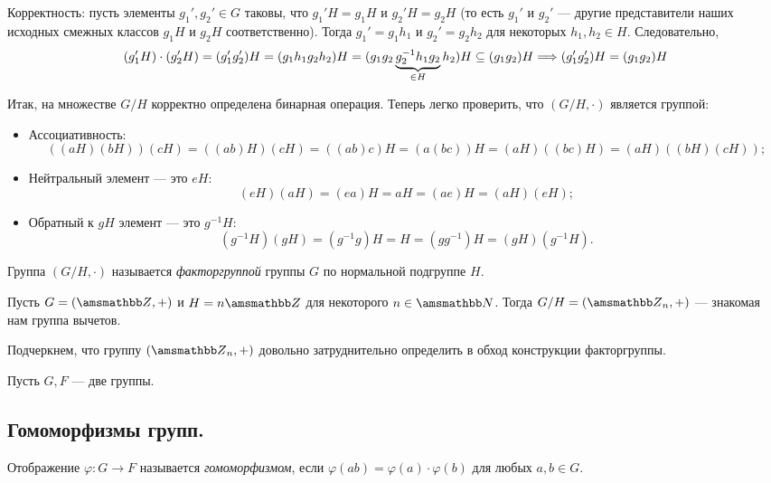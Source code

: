 Корректность: пусть элементы $g_1', g_2' \in G$ таковы, что 
$g_1'H = g_1H$ и $g_2'H = g_2H$ (то есть $g_1'$ и $g_2'$ --- другие
представители наших исходных смежных классов $g_1H$ и $g_2H$ соответственно).
Тогда $g_1' = g_1h_1$ и $g_2' = g_2h_2$ для некоторых $h_1, h_2 \in H$.
Следовательно,
\[
    (g_1'H) \cdot (g_2'H) = (g_1'g_2')H = (g_1h_1g_2h_2)H = 
    (g_1g_2\underbrace{g_2^{-1}h_1g_2}_{\in H}h_2)H \subseteq (g_1g_2)H \Longrightarrow 
    (g_1'g_2')H = (g_1g_2)H
\]

Итак, на множестве $G / H$ корректно определена бинарная операция.
Теперь легко проверить, что $(G / H, \cdot)$ является группой:
\vspace{-0.2cm}
\begin{itemize}
    \item Ассоциативность:
    \[
        ((aH)(bH))(cH) = ((ab)H)(cH) = ((ab)c)H = (a(bc))H = (aH)((bc)H) = 
        (aH)((bH)(cH));
    \]
    \item Нейтральный элемент --- это $eH$:
    \[
        (eH)(aH) = (ea)H = aH = (ae)H = (aH)(eH);
    \]
    \item Обратный к $gH$ элемент --- это $g^{-1}H$:
    \[
        (g^{-1}H)(gH) = (g^{-1}g)H = H = (gg^{-1})H = (gH)(g^{-1}H).
    \]
\end{itemize}

\begin{definition}
    Группа $(G / H, \cdot)$ называется \textit{факторгруппой} группы $G$
    по нормальной подгруппе $H$.
\end{definition}

\begin{example}
    Пусть $G = (\ZZ, +)$ и $H = n\ZZ$ для некоторого $n \in \NN$.
    Тогда $G / H = (\ZZ_n, +)$ --- знакомая нам группа вычетов.
\end{example}

Подчеркнем, что группу $(\ZZ_n, +)$ довольно затруднительно определить в обход
конструкции факторгруппы.

\newpage
\mysection

Пусть $G, F$ --- две группы.

\subsection{Гомоморфизмы групп.}
\begin{definition}
    Отображение $\varphi: G \to F$ называется \textit{гомоморфизмом}, если 
    $\varphi(ab) = \varphi(a) \cdot \varphi(b)$ для любых $a, b \in G$.
\end{definition}


